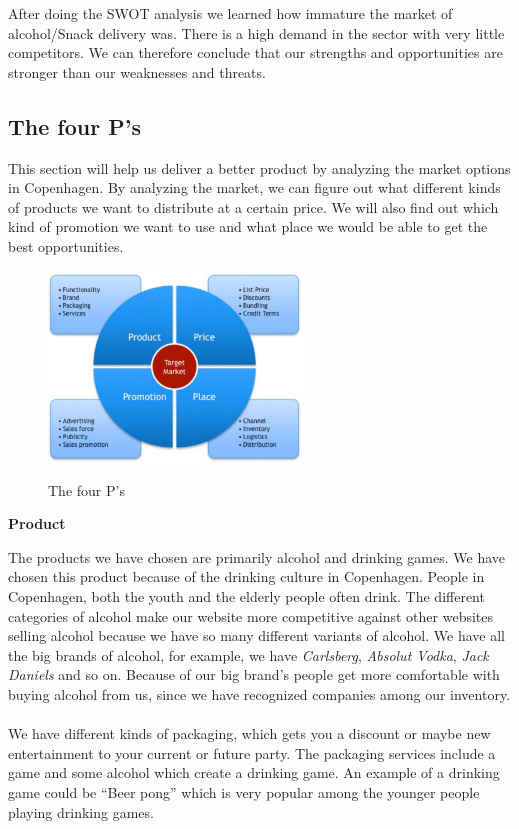 \documentclass[12p]{article}
\begin{document}
After doing the SWOT analysis we learned how immature the market of alcohol/Snack delivery was. There is a high demand in the sector %
with very little competitors.
We can therefore conclude that our strengths and opportunities are stronger than our weaknesses and threats. 

\newpage


\subsection{The four P's} \label{TheFourPs}

This section will help us deliver a better product by analyzing the market options in Copenhagen. By analyzing the market, we can figure out what different kinds of products we want to distribute at a certain price. We will also find out which kind of promotion we want to use and what place we would be able to get the best opportunities. 

\begin{figure}[h]
    \center
    \includegraphics[width=0.6\textwidth]{4p}
    \label{PPPP}
    \caption{The four P's}
\end{figure}

\textbf{Product}

The products we have chosen are primarily alcohol and drinking games. We have chosen this product because of the drinking culture in Copenhagen. People in Copenhagen, both the youth and the elderly people often drink. The different categories of alcohol make our website more competitive against other websites selling alcohol because we have so many different variants of alcohol. We have all the big brands of alcohol, for example, we have \emph{Carlsberg}, \emph{Absolut Vodka}, \emph{Jack Daniels} and so on. Because of our big brand's people get more comfortable with buying alcohol from us, since we have recognized companies among our inventory.
\\ \\
We have different kinds of packaging, which gets you a discount or maybe new entertainment to your current or future party. The packaging services include a game and some alcohol which create a drinking game. An example of a drinking game could be “Beer pong” which is very popular among the younger people playing drinking games. \\
\end{document}
